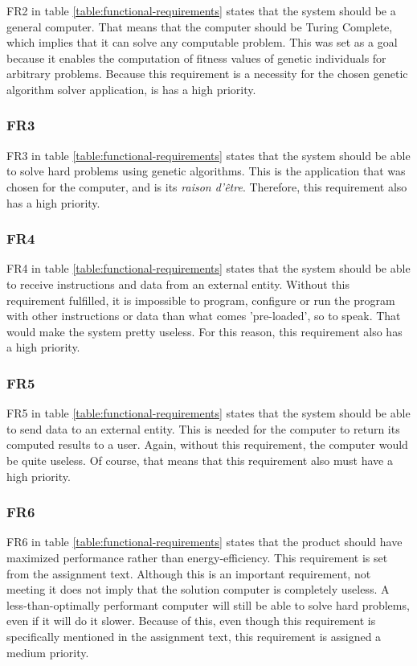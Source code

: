  FR2 in table \vref{table:functional-requirements} states that the system should be a general computer.
 That means that the computer should be Turing Complete, which implies that it can solve any computable problem.
 This was set as a goal because it enables the computation of fitness values of genetic individuals for arbitrary problems. 
 Because this requirement is a necessity for the chosen genetic algorithm solver application, is has a high priority.

\subsubsection{FR3}

FR3 in table \vref{table:functional-requirements} states that the system should be able to solve hard problems using genetic algorithms.
This is the application that was chosen for the computer, and is its \textit{raison d'être}.
Therefore, this requirement also has a high priority.

\subsubsection{FR4}

FR4 in table \vref{table:functional-requirements} states that the system should be able to receive instructions and data from an external entity.
Without this requirement fulfilled, it is impossible to program, configure or run the program with other instructions or data than what comes 'pre-loaded', so to speak.
That would make the system pretty useless.
For this reason, this requirement also has a high priority.

\subsubsection{FR5}

FR5 in table \vref{table:functional-requirements} states that the system should be able to send data to an external entity.
This is needed for the computer to return its computed results to a user.
Again, without this requirement, the computer would be quite useless.
Of course, that means that this requirement also must have a high priority.

\subsubsection{FR6}

FR6 in table \vref{table:functional-requirements} states that the product should have maximized performance rather than energy-efficiency.
This requirement is set from the assignment text.
Although this is an important requirement, not meeting it does not imply that the solution computer is completely useless.
A less-than-optimally performant computer will still be able to solve hard problems, even if it will do it slower.
Because of this, even though this requirement is specifically mentioned in the assignment text, this requirement is assigned a medium priority.

